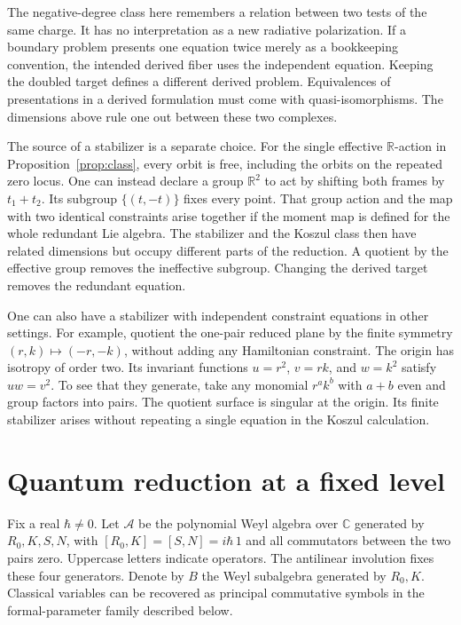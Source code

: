 \documentclass[11pt,letterpaper]{article}
\newcommand{\cA}{\mathcal A}
\newcommand{\CC}{\mathbb C}
\newcommand{\RR}{\mathbb R}
\begin{document}
The negative-degree class here remembers a relation between two tests of the same charge. It
has no interpretation as a new radiative polarization. If a boundary problem presents one
equation twice merely as a bookkeeping convention, the intended derived fiber uses the
independent equation. Keeping the doubled target defines a different derived problem.
Equivalences of presentations in a derived formulation must come with quasi-isomorphisms. The
dimensions above rule one out between these two complexes.

The source of a stabilizer is a separate choice. For the single effective $\RR$-action in
Proposition~\ref{prop:class}, every orbit is free, including the orbits on the repeated zero
locus. One can instead declare a group $\RR^2$ to act by shifting both frames by $t_1+t_2$.
Its subgroup $\{(t,-t)\}$ fixes every point. That group action and the map with two identical
constraints arise together if the moment map is defined for the whole redundant Lie algebra.
The stabilizer and the Koszul class then have related dimensions but occupy different parts of
the reduction. A quotient by the effective group removes the ineffective subgroup. Changing
the derived target removes the redundant equation.

One can also have a stabilizer with independent constraint equations in other settings. For
example, quotient the one-pair reduced plane by the finite symmetry $(r,k)\mapsto(-r,-k)$,
without adding any Hamiltonian constraint. The origin has isotropy of order two. Its invariant
functions $u=r^2$, $v=rk$, and $w=k^2$ satisfy $uw=v^2$. To see that they generate, take any
monomial $r^ak^b$ with $a+b$ even and group factors into pairs. The quotient surface is
singular at the origin. Its finite stabilizer arises without repeating a single equation in
the Koszul calculation.

\section{Quantum reduction at a fixed level}
\label{sec:quantum}
Fix a real $\hbar\ne0$. Let $\cA$ be the polynomial Weyl algebra over $\CC$ generated by
$R_0,K,S,N$, with $[R_0,K]=[S,N]=i\hbar\,1$ and all commutators between the two pairs zero.
Uppercase letters indicate operators. The antilinear involution fixes these four generators.
Denote by $B$ the Weyl subalgebra generated by $R_0,K$. Classical variables can be recovered
as principal commutative symbols in the formal-parameter family described below.
\end{document}
